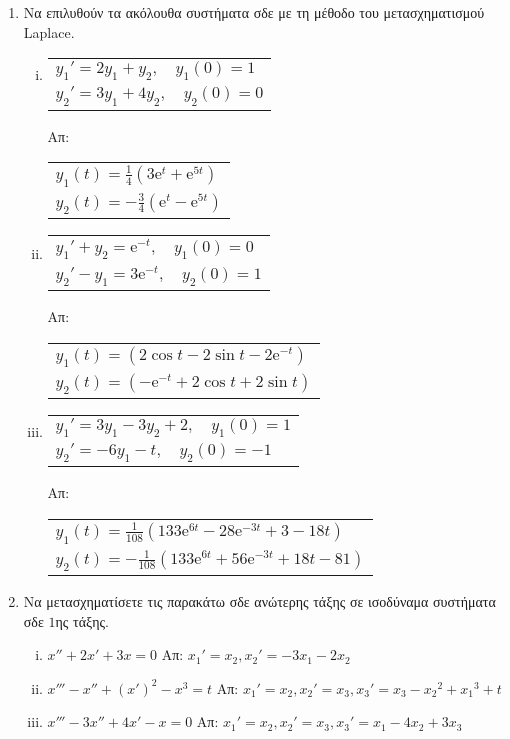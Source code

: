 \begin{enumerate}
  \item Να επιλυθούν τα ακόλουθα συστήματα σδε με τη μέθοδο του μετασχηματισμού Laplace.
    \begin{enumerate}[i),itemsep=10pt]
      \item \begin{tabular}{l}
          $ y_{1}'=2 y_{1}+ y_{2}, \quad y_{1}(0)=1 $ \\
          $ y_{2}'= 3 y_{1}+ 4 y_{2}, \quad y_{2}(0)= 0 $ 
        \end{tabular} \hfill Απ: 
        \begin{tabular}{l}
          $ y_{1}(t) = \frac{1}{4} \left(3 \mathrm{e}^{t} + \mathrm{e}^{5t}\right) $ \\
          $ y_{2}(t) = -\frac{3}{4} \left( \mathrm{e}^{t} -  \mathrm{e}^{5t}\right) $ 
        \end{tabular}
      \item \begin{tabular}{l}
          $ y_{1}'+ y_{2} = \mathrm{e}^{-t}, \quad y_{1}(0)=0 $ \\
          $ y_{2}' - y_{1} =3\mathrm{e}^{-t}, \quad y_{2}(0)=1 $
        \end{tabular} \hfill Απ: 
        \begin{tabular}{l}
          $ y_{1}(t) = (2 \cos{t} - 2 \sin{t} -2 \mathrm{e}^{-t}) $ \\
          $ y_{2}(t) = ( - \mathrm{e}^{-t} + 2 \cos{t} + 2 \sin{t}) $
        \end{tabular}
      \item \begin{tabular}{l}
          $ y_{1}' = 3 y_{1}- 3 y_{2}+2, \quad y_{1}(0)=1 $ \\
          $ y_{2}' = -6 y_{1} - t, \quad y_{2}(0)=-1 $
        \end{tabular}\hfill \hfill Απ: 
        \begin{tabular}{l}
          $y_{1}(t)=\frac{1}{108}\left(133 \mathrm{e}^{6t} - 28 \mathrm{e}^{-3t} + 3 -18t
          \right)$ \\
          $y_{2}(t)=-\frac{1}{108}\left(133 \mathrm{e}^{6t} + 56 
          \mathrm{e}^{-3t} + 18t -81 \right)$ 
        \end{tabular} 
    \end{enumerate}

  \item Να μετασχηματίσετε τις παρακάτω σδε ανώτερης τάξης σε 
    ισοδύναμα συστήματα σδε $1$ης τάξης.

    \begin{enumerate}[i),itemsep=10pt]
      \item $x''+2x'+3x=0$ \hfill Απ: ${x_{1}}'= x_{2}, {x_{2}}'=-3x_{1}-2x_{2}$
      \item $x'''-x''+(x')^{2}-x^{3}=t$ 
        \hfill Απ: ${x_{1}}'= x_{2}, {x_{2}}'=x_{3},{x_{3}}'=x_{3}-{x_{2}}^{2}+
        {x_{1}}^{3}+t$
      \item $x'''-3x''+4x'-x=0$ 
        \hfill Απ: ${x_{1}}'= x_{2}, {x_{2}}'=x_{3}, {x_{3}}'=x_{1}-4x_{2}+3x_{3}$
    \end{enumerate}
\end{enumerate}



